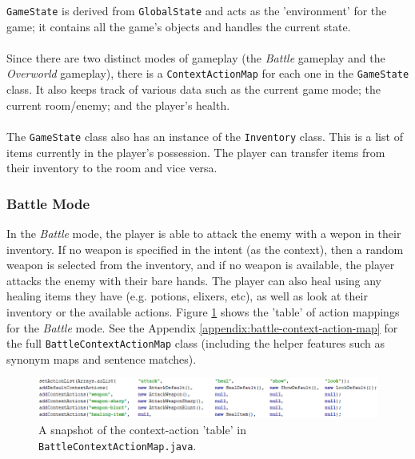 \documentclass[11pt]{article}
\begin{document}
\texttt{GameState} is derived from \texttt{GlobalState} and acts as the 'environment' for the game; it contains all the game's objects and handles the current state.
\\
\\
Since there are two distinct modes of gameplay (the \textit{Battle} gameplay and the \textit{Overworld} gameplay), there is a \texttt{ContextActionMap} for each one in the \texttt{GameState} class. It also keeps track of various data such as the current game mode; the current room/enemy; and the player's health.
\\
\\
The \texttt{GameState} class also has an instance of the \texttt{Inventory} class. This is a list of items currently in the player's possession. The player can transfer items from their inventory to the room and vice versa.

\subsubsection{Battle Mode}

In the \textit{Battle} mode, the player is able to attack the enemy with a wepon in their inventory. If no weapon is specified in the intent (as the context), then a random weapon is selected from the inventory, and if no weapon is available, the player attacks the enemy with their bare hands. The player can also heal using any healing items they have (e.g. potions, elixers, etc), as well as look at their inventory or the available actions. Figure \ref{fig:battle-context-action-map} shows the 'table' of action mappings for the \textit{Battle} mode. See the Appendix \ref{appendix:battle-context-action-map} for the full \texttt{BattleContextActionMap} class (including the helper features such as synonym maps and sentence matches).

\begin{center}
\begin{figure}[H]
\begin{center}
  \includegraphics[width=\linewidth]{battle-context-action-map.png}
  \caption{A snapshot of the context-action 'table' in \texttt{BattleContextActionMap.java}.}
  \label{fig:battle-context-action-map}
  \end{center}
\end{figure}
\end{center}
\end{document}
